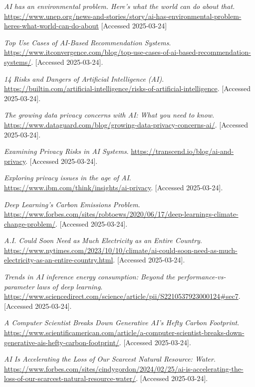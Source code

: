 \documentclass[licencjacka,en]{pracamgr}
\begin{document}
\begin{thebibliography}{99}
    \textit{AI has an environmental problem. Here’s what the world can do about that.}
    \url{https://www.unep.org/news-and-stories/story/ai-has-environmental-problem-heres-what-world-can-do-about}
    [Accessed 2025-03-24]

    \textit{Top Use Cases of AI-Based Recommendation Systems}.
    \url{https://www.itconvergence.com/blog/top-use-cases-of-ai-based-recommendation-systems/}.
    [Accessed 2025-03-24].

    \textit{ 14 Risks and Dangers of Artificial Intelligence (AI)}.
    \url{https://builtin.com/artificial-intelligence/risks-of-artificial-intelligence}.
    [Accessed 2025-03-24].

    \textit{The growing data privacy concerns with AI: What you need to know}.
    \url{https://www.dataguard.com/blog/growing-data-privacy-concerns-ai/}.
    [Accessed 2025-03-24].

    \textit{Examining Privacy Risks in AI Systems}.
    \url{https://transcend.io/blog/ai-and-privacy}.
    [Accessed 2025-03-24].

    \textit{Exploring privacy issues in the age of AI}.
    \url{https://www.ibm.com/think/insights/ai-privacy}.
    [Accessed 2025-03-24].


    \textit{Deep Learning’s Carbon Emissions Problem}.
    \url{https://www.forbes.com/sites/robtoews/2020/06/17/deep-learnings-climate-change-problem/}.
    [Accessed 2025-03-24].

    \textit{A.I. Could Soon Need as Much Electricity as an Entire Country}.
    \url{https://www.nytimes.com/2023/10/10/climate/ai-could-soon-need-as-much-electricity-as-an-entire-country.html}.
    [Accessed 2025-03-24].

    \textit{Trends in AI inference energy consumption: Beyond the performance-vs-parameter laws of deep learning}.
    \url{https://www.sciencedirect.com/science/article/pii/S2210537923000124#sec7}.
    [Accessed 2025-03-24].

    \textit{A Computer Scientist Breaks Down Generative AI’s Hefty Carbon Footprint}.
    \url{https://www.scientificamerican.com/article/a-computer-scientist-breaks-down-generative-ais-hefty-carbon-footprint/}.
    [Accessed 2025-03-24].

    \textit{AI Is Accelerating the Loss of Our Scarcest Natural Resource: Water}.
    \url{https://www.forbes.com/sites/cindygordon/2024/02/25/ai-is-accelerating-the-loss-of-our-scarcest-natural-resource-water/}.
    [Accessed 2025-03-24].


\end{thebibliography}
\end{document}

